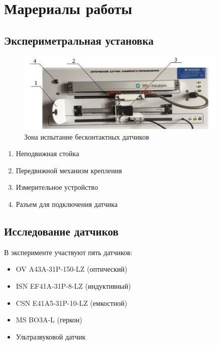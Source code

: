\section{Марериалы работы}
\subsection{Экспериметральная установка}
\begin{figure}[!h]
    \centering
    \includegraphics[width=0.9\textwidth]{img/img}
    \caption{Зона испытание бесконтактных датчиков}
    \label{fig:img}
\end{figure}
\begin{enumerate}
    \item Неподвижная стойка
    \item Передвижной механизм крепления
    \item Измерительное устройство
    \item Разъем для подключения датчика
\end{enumerate}
\subsection{Исследование датчиков}
В эксперименте участвуют пять датчиков:
\begin{itemize}
    \item OV A43A-31P-150-LZ (оптический)
    \item ISN EF41A-31P-8-LZ (индуктивный)
    \item CSN E41A5-31P-10-LZ (емкостной)
    \item MS BO3A-L (геркон)
    \item Ультразвуковой датчик
\end{itemize}

